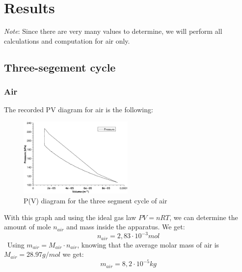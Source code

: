 \documentclass{scrartcl}
\begin{document}
\section{Results}

\textit{Note}: Since there are very many values to determine, we will perform all calculations and computation for air only.

\subsection{Three-segement cycle}

\subsubsection{Air}
The recorded PV diagram for air is the following:
\begin{figure}[h]
    \centering
    \includegraphics[width=0.5\textwidth]{3seg/PV_air_3.eps}
    \caption{P(V) diagram for the three segment cycle of air}
    \label{fig:3seg_air}
\end{figure}
\FloatBarrier

With this graph and using the ideal gas law $PV = nRT$, we can determine the amount of mole $n_{air}$ and mass inside the apparatus.
We get:
\[\ n_{air} = 2,83 \cdot 10^{-3} mol \]\
Using $m_{air} = M_{air}\cdot n_{air}$, knowing that the average molar mass of air is $M_{air} = 28.97 g/mol$ we get:
\[\ m_{air} = 8,2 \cdot 10^{-5} kg \]\ 
\vspace{0.5cm}
\end{document}
